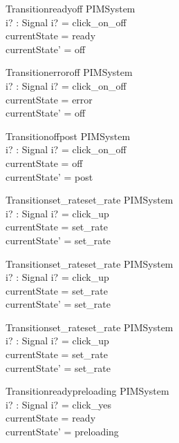 \begin{schema}{Transitionreadyoff}
  \Delta PIMSystem\\
  i? : Signal
\where
  i? = click\_on\_off \\
  currentState = ready \\
  currentState' = off
\end{schema}

\begin{schema}{Transitionerroroff}
  \Delta PIMSystem\\
  i? : Signal
\where
  i? = click\_on\_off \\
  currentState = error \\
  currentState' = off
\end{schema}

\begin{schema}{Transitionoffpost}
  \Delta PIMSystem\\
  i? : Signal
\where
  i? = click\_on\_off \\
  currentState = off \\
  currentState' = post
\end{schema}

\begin{schema}{Transitionset\_rateset\_rate}
  \Delta PIMSystem\\
  i? : Signal
\where
  i? = click\_up \\
  currentState = set\_rate \\
  currentState' = set\_rate
\end{schema}

\begin{schema}{Transitionset\_rateset\_rate}
  \Delta PIMSystem\\
  i? : Signal
\where
  i? = click\_up \\
  currentState = set\_rate \\
  currentState' = set\_rate
\end{schema}

\begin{schema}{Transitionset\_rateset\_rate}
  \Delta PIMSystem\\
  i? : Signal
\where
  i? = click\_up \\
  currentState = set\_rate \\
  currentState' = set\_rate
\end{schema}

\begin{schema}{Transitionreadypreloading}
  \Delta PIMSystem\\
  i? : Signal
\where
  i? = click\_yes \\
  currentState = ready \\
  currentState' = preloading
\end{schema}

